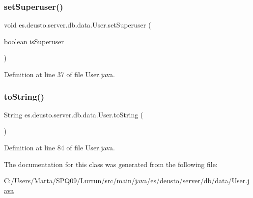 \subsubsection{\texorpdfstring{set\+Superuser()}{setSuperuser()}}
{\footnotesize\ttfamily void es.\+deusto.\+server.\+db.\+data.\+User.\+set\+Superuser (\begin{DoxyParamCaption}\item[{boolean}]{is\+Superuser }\end{DoxyParamCaption})}



Definition at line 37 of file User.\+java.

\mbox{\label{classes_1_1deusto_1_1server_1_1db_1_1data_1_1_user_a494980951c4c71c0a793994b7bcd5101}} 
\subsubsection{\texorpdfstring{to\+String()}{toString()}}
{\footnotesize\ttfamily String es.\+deusto.\+server.\+db.\+data.\+User.\+to\+String (\begin{DoxyParamCaption}{ }\end{DoxyParamCaption})}



Definition at line 84 of file User.\+java.



The documentation for this class was generated from the following file\+:\begin{DoxyCompactItemize}
\item 
C\+:/\+Users/\+Marta/\+S\+P\+Q09/\+Lurrun/src/main/java/es/deusto/server/db/data/\hyperlink{_user_8java}{User.\+java}\end{DoxyCompactItemize}
